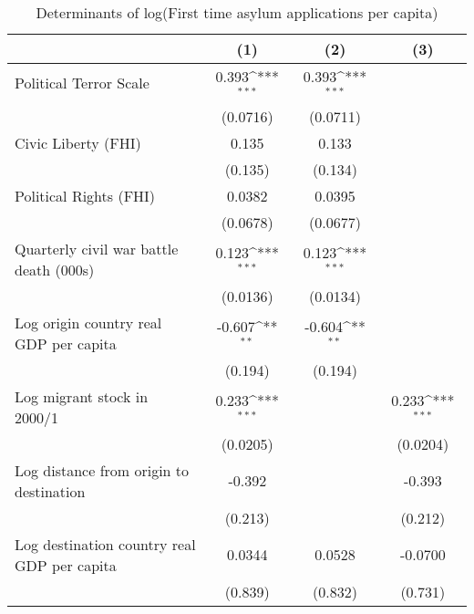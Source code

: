 \begin{table}[htbp]\centering
\def\sym#1{\ifmmode^{#1}\else\(^{#1}\)\fi}
\caption{Determinants of log(First time asylum applications per capita)}
\begin{tabular}{l*{3}{c}}
\hline\hline
                    &\multicolumn{1}{c}{(1)}         &\multicolumn{1}{c}{(2)}         &\multicolumn{1}{c}{(3)}         \\
\hline
Political Terror Scale&       0.393\sym{***}&       0.393\sym{***}&                     \\
                    &    (0.0716)         &    (0.0711)         &                     \\
[1em]
Civic Liberty (FHI) &       0.135         &       0.133         &                     \\
                    &     (0.135)         &     (0.134)         &                     \\
[1em]
Political Rights (FHI)&      0.0382         &      0.0395         &                     \\
                    &    (0.0678)         &    (0.0677)         &                     \\
[1em]
Quarterly civil war battle death (000s)&       0.123\sym{***}&       0.123\sym{***}&                     \\
                    &    (0.0136)         &    (0.0134)         &                     \\
[1em]
Log origin country real GDP per capita&      -0.607\sym{**} &      -0.604\sym{**} &                     \\
                    &     (0.194)         &     (0.194)         &                     \\
[1em]
Log migrant stock in 2000/1&       0.233\sym{***}&                     &       0.233\sym{***}\\
                    &    (0.0205)         &                     &    (0.0204)         \\
[1em]
Log distance from origin to destination&      -0.392         &                     &      -0.393         \\
                    &     (0.213)         &                     &     (0.212)         \\
[1em]
Log destination country real GDP per capita&      0.0344         &      0.0528         &     -0.0700         \\
                    &     (0.839)         &     (0.832)         &     (0.731)         \\

\end{tabular}
\end{table}
